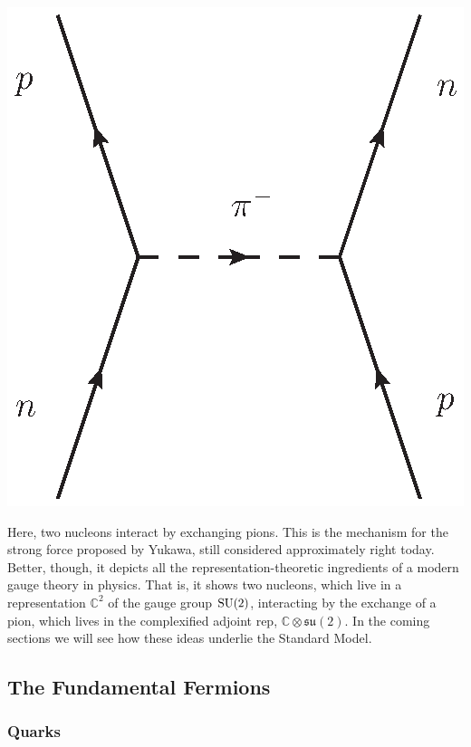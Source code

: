 \documentclass[12pt]{article}
\newcommand{\C}{{\mathbb C}}  %
\newcommand{\SU}{{\rm SU}}    %
\newcommand{\su}{{\mathfrak{su}}}  %
\begin{document}
\begin{center}
	\includegraphics[scale=0.75]{piN_exchange}
\end{center}

Here, two nucleons interact by exchanging pions. This is the mechanism
for the strong force proposed by Yukawa, still considered
approximately right today.  Better, though, it depicts all the
representation-theoretic ingredients of a modern gauge theory in
physics. That is, it shows two nucleons, which live in a
representation $\C^2$ of the gauge group $\SU(2)$, interacting by the
exchange of a pion, which lives in the complexified adjoint rep,
$\C \otimes \su(2)$. In the coming sections we will see how these
ideas underlie the Standard Model.

\subsection{The Fundamental Fermions} \label{sec:fermions}

\subsubsection{Quarks} \label{sec:quarks}
\end{document}
